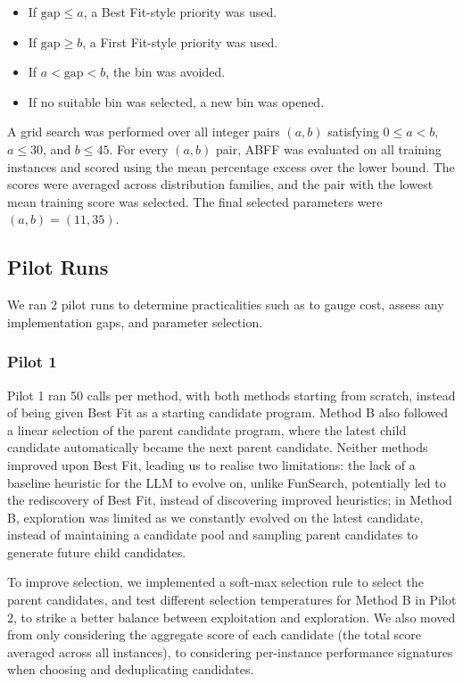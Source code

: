 \documentclass[12pt]{article}
\begin{document}
\begin{itemize}
    \item If $\text{gap} \leq a$, a Best Fit-style priority was used.
    \item If $\text{gap} \geq b$, a First Fit-style priority was used.
    \item If $a < \text{gap} < b$, the bin was avoided.
    \item If no suitable bin was selected, a new bin was opened.
\end{itemize}

A grid search was performed over all integer pairs
$(a,b)$ satisfying $0 \leq a < b$, $a \leq 30$,
and $b \leq 45$. For every $(a,b)$ pair, ABFF was
evaluated on all training instances and scored using
the mean percentage excess over the lower bound.
The scores were averaged across distribution families,
and the pair with the lowest mean training score was
selected. The final selected parameters were
$(a,b) = (11,35)$.


\subsection{Pilot Runs}
We ran 2 pilot runs to determine practicalities such as to gauge cost, assess any implementation gaps, and parameter selection.

\subsubsection{Pilot 1}
Pilot 1 ran 50 calls per method, with both methods starting from scratch, instead of being given Best Fit as a starting candidate program. Method B also followed a linear selection of the parent candidate program, where the latest child candidate automatically became the next parent candidate. Neither methods improved upon Best Fit, leading us to realise two limitations: the lack of a baseline heuristic for the LLM to evolve on, unlike FunSearch, potentially led to the rediscovery of Best Fit, instead of discovering improved heuristics; in Method B, exploration was limited as we constantly evolved on the latest candidate, instead of maintaining a candidate pool and sampling parent candidates to generate future child candidates.

To improve selection, we implemented a soft-max selection rule to select the parent candidates, and test different selection temperatures for Method B in Pilot 2, to strike a better balance between exploitation and exploration. We also moved from only considering the aggregate score of each candidate (the total score averaged across all instances), to considering per-instance performance signatures when choosing and deduplicating candidates.
\end{document}
